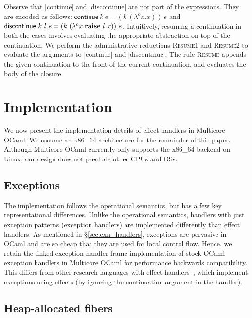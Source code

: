 \documentclass[sigplan,screen]{acmart}
\newcommand{\olam}[2]{\lambda^o #1. #2}
\newcommand{\kw}[1]{\text{\bf #1}}
\newcommand{\throw}[2]{\kw{raise} ~#1 ~#2}
\begin{document}
Observe that |continue| and |discontinue| are not part of the expressions. They
are encoded as follows: $\textsf{continue} ~k ~e = (k ~(\olam{x}{x})) ~e$ and
$\textsf{discontinue} ~k ~l ~e = (k ~(\olam{x}{\throw{l}{x}})) ~e$.
Intuitively, resuming a continuation in both the cases involves evaluating the
appropriate abstraction on top of the continuation. We perform the
administrative reductions \textsc{Resume1} and \textsc{Resume2} to evaluate the
arguments to |continue| and |discontinue|. The rule \textsc{Resume} appends the
given continuation to the front of the current continuation, and evaluates the
body of the closure.

\section{Implementation}
\label{sec:impl}

We now present the implementation details of effect handlers in Multicore
OCaml. We assume an x86\_64 architecture for the remainder of this paper.
Although Multicore OCaml currently only supports the x86\_64 backend on Linux,
our design does not preclude other CPUs and OSs.

\subsection{Exceptions}

The implementation follows the operational semantics, but has a few key
representational differences. Unlike the operational semantics, handlers with
just exception patterns (exception handlers) are implemented differently than
effect handlers. As mentioned in \S\ref{sec:exn_handlers}, exceptions are
pervasive in OCaml and are so cheap that they are used for local control flow.
Hence, we retain the linked exception handler frame implementation of stock
OCaml exception handlers in Multicore OCaml for performance backwards
compatibility. This differs from other research languages with effect
handlers~\cite{Hillerstrom20,Frank,Eff}, which implement exceptions using
effects (by ignoring the continuation argument in the handler).

\subsection{Heap-allocated fibers}
\label{sec:hafibers}
\end{document}

